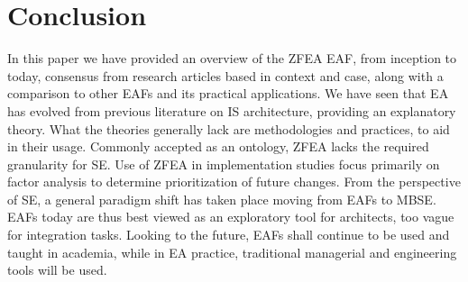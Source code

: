 \documentclass[12pt,conference]{IEEEtran}
\begin{document}
\section{Conclusion}
In this paper we have provided an overview of the ZFEA EAF, from inception to today, consensus from research articles based in context and case, along with a comparison to other EAFs and its practical applications. 
We have seen that EA has evolved from previous literature on IS architecture, providing an explanatory theory.
What the theories generally lack are methodologies and practices, to aid in their usage. 
Commonly accepted as an ontology, ZFEA lacks the required granularity for SE. 
Use of ZFEA in implementation studies focus primarily on factor analysis to determine prioritization of future changes. 
From the perspective of SE, a general paradigm shift has taken place moving from EAFs to MBSE. 
EAFs today are thus best viewed as an exploratory tool for architects, too vague for integration tasks. 
Looking to the future, EAFs shall continue to be used and taught in academia, while in EA practice, traditional managerial and engineering tools will be used. 



% 
\end{document}

